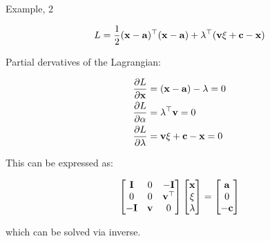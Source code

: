 \documentclass{beamer}
\begin{document}
\begin{frame}{Example, 2}
	\begin{flushleft}
		
		\begin{equation}
			L =  \frac{1}{2}(\mathbf{x}- \mathbf{a})^\top(\mathbf{x}- \mathbf{a}) + \lambda^\top ( \mathbf{v} \xi + \mathbf{c} - \mathbf{x})
		\end{equation}
		
		Partial dervatives of the Lagrangian:
		
		\begin{align}
			\frac{\partial L}{\partial \mathbf{x}} &=  (\mathbf{x}- \mathbf{a}) - \lambda = 0
			\\
			\frac{\partial L}{\partial \alpha} &=  \lambda^\top \mathbf{v} = 0
			\\
			\frac{\partial L}{\partial  \lambda} &=   \mathbf{v} \xi + \mathbf{c} - \mathbf{x} = 0
		\end{align}
		
		This can be expressed as:
		
		\begin{align}
				\begin{bmatrix}
					\mathbf{I} & 0 & -\mathbf{I} 
					\\
					0 & 0 & \mathbf{v}^\top
					\\
					-\mathbf{I} & \mathbf{v} & 0
				\end{bmatrix}
				\begin{bmatrix}
				\mathbf{x} \\ \xi \\  \lambda
				\end{bmatrix}
				=
				\begin{bmatrix}
					\mathbf{a} \\ 0 \\  -\mathbf{c}
				\end{bmatrix}
		\end{align}
		
		which can be solved via inverse.
		
	\end{flushleft}
\end{frame}
\end{document}
